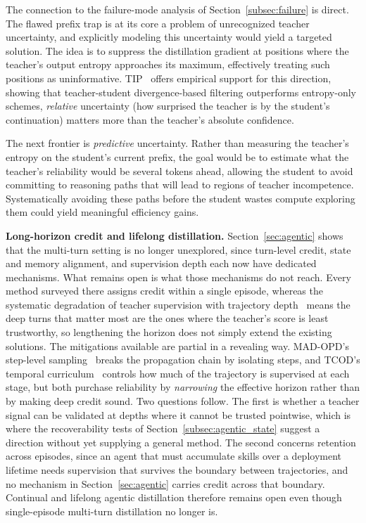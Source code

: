\documentclass{article} %
\begin{document}
The connection to the failure-mode analysis of Section~\ref{subsec:failure} is direct. The flawed prefix trap is at its core a problem of unrecognized teacher uncertainty, and explicitly modeling this uncertainty would yield a targeted solution. The idea is to suppress the distillation gradient at positions where the teacher's output entropy approaches its maximum, effectively treating such positions as uninformative. TIP~\citep{2604.14084} offers empirical support for this direction, showing that teacher-student divergence-based filtering outperforms entropy-only schemes, \emph{relative} uncertainty (how surprised the teacher is by the student's continuation) matters more than the teacher's absolute confidence.

The next frontier is \emph{predictive} uncertainty. Rather than measuring the teacher's entropy on the student's current prefix, the goal would be to estimate what the teacher's reliability would be several tokens ahead, allowing the student to avoid committing to reasoning paths that will lead to regions of teacher incompetence. Systematically avoiding these paths before the student wastes compute exploring them could yield meaningful efficiency gains.

\textbf{Long-horizon credit and lifelong distillation.} Section~\ref{sec:agentic} shows that the multi-turn setting is no longer unexplored, since turn-level credit, state and memory alignment, and supervision depth each now have dedicated mechanisms. What remains open is what those mechanisms do not reach. Every method surveyed there assigns credit within a single episode, whereas the systematic degradation of teacher supervision with trajectory depth~\citep{2604.13016} means the deep turns that matter most are the ones where the teacher's score is least trustworthy, so lengthening the horizon does not simply extend the existing solutions. The mitigations available are partial in a revealing way. MAD-OPD's step-level sampling~\citep{2605.01347} breaks the propagation chain by isolating steps, and TCOD's temporal curriculum~\citep{2604.24005} controls how much of the trajectory is supervised at each stage, but both purchase reliability by \emph{narrowing} the effective horizon rather than by making deep credit sound. Two questions follow. The first is whether a teacher signal can be validated at depths where it cannot be trusted pointwise, which is where the recoverability tests of Section~\ref{subsec:agentic_state} suggest a direction without yet supplying a general method. The second concerns retention across episodes, since an agent that must accumulate skills over a deployment lifetime needs supervision that survives the boundary between trajectories, and no mechanism in Section~\ref{sec:agentic} carries credit across that boundary. Continual and lifelong agentic distillation therefore remains open even though single-episode multi-turn distillation no longer is.
\end{document}
